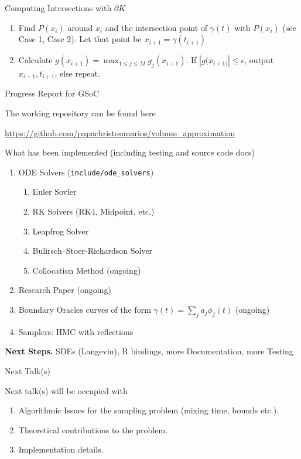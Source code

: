 \documentclass[10pt]{beamer}
\begin{document}
\begin{frame}[allowframebreaks]{Computing Intersections with $\partial K$}
    \begin{enumerate}
        
        \item Find $P(x_i)$ around $x_i$ and the intersection point of $\gamma(t)$ with $P(x_i)$ (see Case 1, Case 2). Let that point be $x_{i + 1} = \gamma(t_{i + 1})$
        \item Calculate $g(x_{i + 1}) = \max_{1 \le j \le M} g_j(x_{i + 1})$. If $|g(x_{i + 1)}| \le \epsilon$, output $x_{i + 1}, t_{i + 1}$, else repeat. 
    \end{enumerate}
    
\end{frame}

\begin{frame}{Progress Report for GSoC}
 
    The working repository can be found here
    
    \begin{center}
        \url{https://github.com/papachristoumarios/volume_approximation}
    \end{center}
 
    What has been implemented (including testing and source code docs)
    
    \begin{enumerate}
    \item ODE Solvers (\texttt{include/ode\_solvers})
    \begin{enumerate}
        \item Euler Sovler
        \item RK Solvers (RK4, Midpoint, etc.)
        \item Leapfrog Solver
        \item Bulirsch–Stoer-Richardson Solver
        \item Collocation Method (ongoing)
    \end{enumerate}
    \item Research Paper (ongoing)
    \item Boundary Oracles curves of the form $\gamma(t) = \sum_j a_j \phi_j(t)$ (ongoing)
    \item Samplers: HMC with reflections 
    \end{enumerate}
 
    \textbf{Next Steps.} SDEs (Langevin), R bindings, more Documentation, more Testing 
    
    
\end{frame}


\begin{frame}{Next Talk(s)}

Next talk(s) will be occupied with 

\begin{enumerate}
    \item Algorithmic Issues for the sampling problem (mixing time, bounds etc.).
    \item Theoretical contributions to the problem.
    \item Implementation details.
\end{enumerate}
    
\end{frame}
\end{document}
